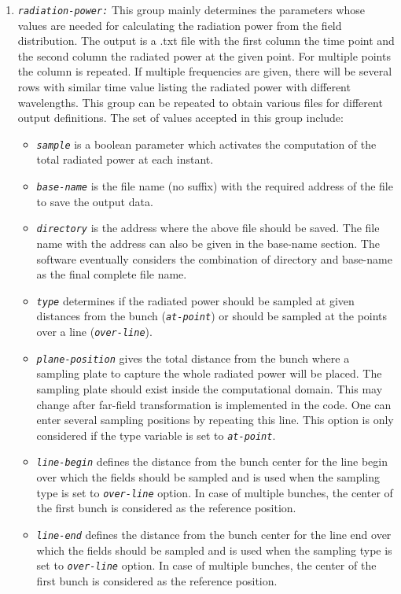 \begin{enumerate}
%
\item {\tt \small \em radiation-power:} This group mainly determines the parameters whose values are needed for calculating the radiation power from the field distribution. The output is a .txt file with the first column the time point and the second column the radiated power at the given point. For multiple points the column is repeated. If multiple frequencies are given, there will be several rows with similar time value listing the radiated power with different wavelengths. This group can be repeated to obtain various files for different output definitions. 
%
The set of values accepted in this group include:
%
\begin{itemize}
	\item {\tt \small \em sample} is a boolean parameter which activates the computation of the total radiated power at each instant.
	\item {\tt \small \em base-name} is the file name (no suffix) with the required address of the file to save the output data.
	\item {\tt \small \em directory} is the address where the above file should be saved. The file name with the address can also be given in the base-name section. The software eventually considers the combination of directory and base-name as the final complete file name.
	\item {\tt \small \em type} determines if the radiated power should be sampled at given distances from the bunch ({\tt \small \em at-point}) or should be sampled at the points over a line ({\tt \small \em over-line}).
	\item {\tt \small \em plane-position} gives the total distance from the bunch where a sampling plate to capture the whole radiated power will be placed. The sampling plate should exist inside the computational domain. This may change after far-field transformation is implemented in the code. One can enter several sampling positions by repeating this line. This option is only considered if the type variable is set to {\tt \small \em at-point}.
	\item {\tt \small \em line-begin} defines the distance from the bunch center for the line begin over which the fields should be sampled and is used when the sampling type is set to {\tt \small \em over-line} option. In case of multiple bunches, the center of the first bunch is considered as the reference position.
	\item {\tt \small \em line-end} defines the distance from the bunch center for the line end over which the fields should be sampled and is used when the sampling type is set to {\tt \small \em over-line} option. In case of multiple bunches, the center of the first bunch is considered as the reference position.

\end{itemize}
\end{enumerate}
